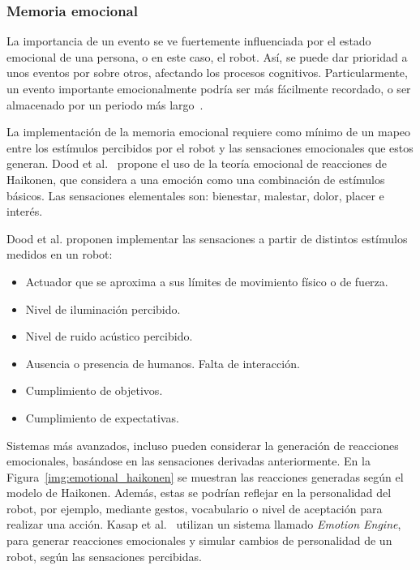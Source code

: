 \subsubsection{Memoria emocional}

La importancia de un evento se ve fuertemente influenciada por el estado emocional de una persona, o en este caso, el robot. Así, se puede dar prioridad a unos eventos por sobre otros, afectando los procesos cognitivos. Particularmente, un evento importante emocionalmente podría ser más fácilmente recordado, o ser almacenado por un periodo más largo~\cite{Deutsch2008}.

La implementación de la memoria emocional requiere como mínimo de un mapeo entre los estímulos percibidos por el robot y las sensaciones emocionales que estos generan. Dood et al.~\cite{Dodd2005} propone el uso de la teoría emocional de reacciones de Haikonen, que considera a una emoción como una combinación de estímulos básicos. Las sensaciones elementales son: bienestar, malestar, dolor, placer e interés.

Dood et al. proponen implementar las sensaciones a partir de distintos estímulos medidos en un robot:
\begin{itemize}
	\item Actuador que se aproxima a sus límites de movimiento físico o de fuerza. 
	\item Nivel de iluminación percibido.
	\item Nivel de ruido acústico percibido.
	\item Ausencia o presencia de humanos. Falta de interacción.
	\item Cumplimiento de objetivos.
	\item Cumplimiento de expectativas.
\end{itemize}

Sistemas más avanzados, incluso pueden considerar la generación de reacciones emocionales, basándose en las sensaciones derivadas anteriormente. En la Figura~\ref{img:emotional_haikonen} se muestran las reacciones generadas según el modelo de Haikonen. Además, estas se podrían reflejar en la personalidad del robot, por ejemplo, mediante gestos, vocabulario o nivel de aceptación para realizar una acción. Kasap et al.~\cite{Kasap2010} utilizan un sistema llamado \textit{Emotion Engine}, para generar reacciones emocionales y simular cambios de personalidad de un robot, según las sensaciones percibidas.

